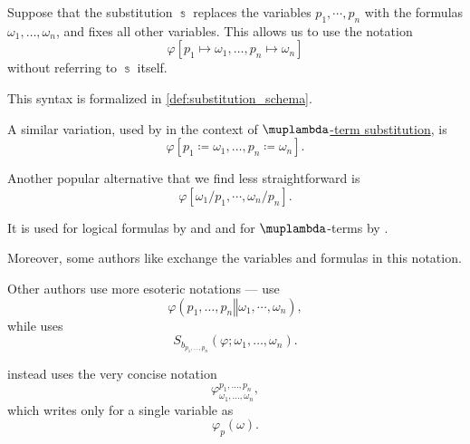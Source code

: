 \begin{remark}\label{rem:substitution_notation}
  Suppose that the substitution \( \Bbbs \) replaces the variables \( p_1, \cdots, p_n \) with the formulas \( \omega_1, \ldots, \omega_n \), and fixes all other variables. This allows us to use the notation
  \begin{equation*}
    \varphi[p_1 \mapsto \omega_1, \ldots, p_n \mapsto \omega_n]
  \end{equation*}
  without referring to \( \Bbbs \) itself.

  This syntax is formalized in \cref{def:substitution_schema}.

  A similar variation, used by  in the context of \hyperref[def:lambda_term_substitution]{\( \muplambda \)-term substitution}, is
  \begin{equation*}
    \varphi[p_1 \coloneqq \omega_1, \ldots, p_n \coloneqq \omega_n].
  \end{equation*}

  Another popular alternative that we find less straightforward is
  \begin{equation*}
    \varphi[\omega_1 / p_1, \cdots, \omega_n / p_n].
  \end{equation*}

  It is used for logical formulas by  and  and for \( \muplambda \)-terms by .

  Moreover, some authors like  exchange the variables and formulas in this notation.

  Other authors use more esoteric notations ---  use
  \begin{equation*}
    \varphi(p_1, \ldots, p_n \mathrel{\Vert} \omega_1, \cdots, \omega_n),
  \end{equation*}
  while  uses
  \begin{equation*}
    S_{b_{p_1, \ldots, p_n}}(\varphi; \omega_1, \ldots, \omega_n).
  \end{equation*}

   instead uses the very concise notation
  \begin{equation*}
    \varphi^{p_1, \ldots, p_n}_{\omega_1, \ldots, \omega_n},
  \end{equation*}
  which  writes only for a single variable as
  \begin{equation*}
    \varphi_p(\omega).
  \end{equation*}
\end{remark}


